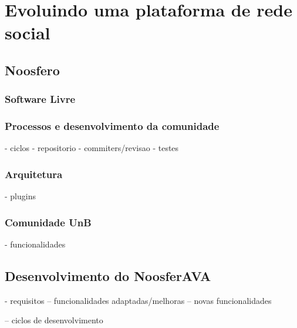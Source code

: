 \chapter{Evoluindo uma plataforma de rede social}
\label{evol-rede-social}

\section{Noosfero}
\label{evol-rede-social}

\subsection{Software Livre}
\label{soft-livre}

\subsection{Processos e desenvolvimento da comunidade}
\label{proc-desenvol-comunidade}


- ciclos
- repositorio
- commiters/revisao
- testes

\subsection{Arquitetura}
\label{arquitetura}
- plugins


\subsection{Comunidade UnB}
\label{comunidade-unb}
- funcionalidades

\section{Desenvolvimento do NoosferAVA}
\label{desen-noosferAVA}
- requisitos
-- funcionalidades adaptadas/melhoras
-- novas funcionalidades

-- ciclos de desenvolvimento